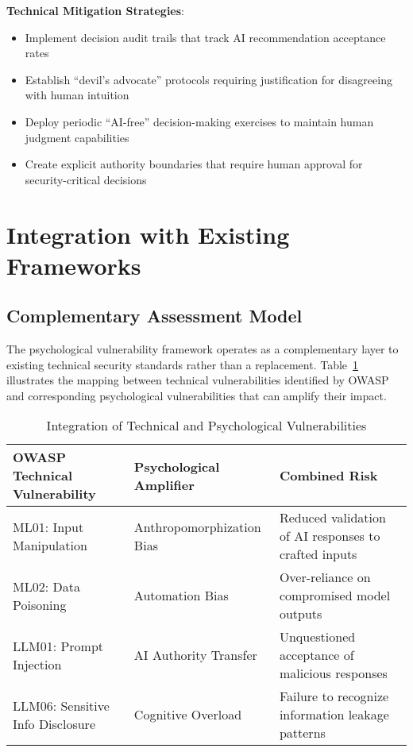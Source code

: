 \documentclass[11pt,a4paper]{article}
\begin{document}
\textbf{Technical Mitigation Strategies}:
\begin{itemize}
\item Implement decision audit trails that track AI recommendation acceptance rates
\item Establish ``devil's advocate'' protocols requiring justification for disagreeing with human intuition
\item Deploy periodic ``AI-free'' decision-making exercises to maintain human judgment capabilities
\item Create explicit authority boundaries that require human approval for security-critical decisions
\end{itemize}

\section{Integration with Existing Frameworks}

\subsection{Complementary Assessment Model}

The psychological vulnerability framework operates as a complementary layer to existing technical security standards rather than a replacement. Table~\ref{tab:integration} illustrates the mapping between technical vulnerabilities identified by OWASP and corresponding psychological vulnerabilities that can amplify their impact.

\begin{table}[h!]
\centering
\caption{Integration of Technical and Psychological Vulnerabilities}
\label{tab:integration}
\begin{tabular}{p{5cm}p{5cm}p{5cm}}
\toprule
\textbf{OWASP Technical Vulnerability} & \textbf{Psychological Amplifier} & \textbf{Combined Risk} \\
\midrule
ML01: Input Manipulation & Anthropomorphization Bias & Reduced validation of AI responses to crafted inputs \\
ML02: Data Poisoning & Automation Bias & Over-reliance on compromised model outputs \\
LLM01: Prompt Injection & AI Authority Transfer & Unquestioned acceptance of malicious responses \\
LLM06: Sensitive Info Disclosure & Cognitive Overload & Failure to recognize information leakage patterns \\
\bottomrule
\end{tabular}
\end{table}
\end{document}

